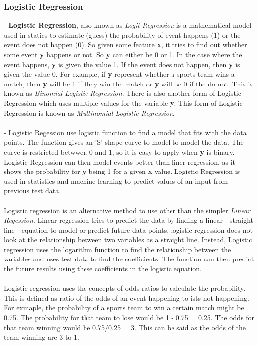 \subsubsection{Logistic Regression}
- \textbf{Logistic Regression}, also known as \textit{Logit Regression} is a mathematical model used in statics to estimate (guess) the probability of event happens (1) or the event does not happen (0). So given some feature \textbf{x}, it tries to find out whether some event \textbf{y} happens or not. So \textbf{y} can either be 0 or 1. In the case where the event happens, \textbf{y} is given the value 1. If the event does not happen, then \textbf{y} is given the value 0. For example, if \textbf{y} represent whether a sports team wins a match, then \textbf{y} will be 1 if they win the match or \textbf{y} will be 0 if the do not. This is known as \textit{Binomial Logistic Regression}. There is also another form of Logistic Regression which uses multiple values for the variable \textbf{y}. This form of Logistic Regression is known as \textit{Multinomial Logistic Regression}.\\
\\
- Logistic Regession use logistic function to find a model that fits with the data points. The function gives an 'S' shape curve to model to model the data. The curve is restricted betwwen 0 and 1, so it is easy to apply when \textbf{y} is binary. Logistic Regression can then model events better than liner regression, as it shows the probability for \textbf{y} being 1 for a given \textbf{x} value. Logistic Regression is used in statistics and machine learning to predict values of an input from previous test data.\\
\\
Logistic regression is an alternative method to use other than the simpler \textit{Linear Regession}. Linear regression tries to predict the data by finding a linear - straight line - equation to model or predict future data points. logistic regression does not look at the relationship between two variables as a straight line. Instead, Logistic regression uses the logarithm function to find the relationship between the variables and uses test data to find the coefficients. The function can then predict the future results using these coefficients in the logistic equation.\\
\\
Logistic regression uses the concepts of odds ratios to calculate the probability. This is defined as ratio  of the odds of an event happening to ists not happening. For exmaple, the probability of a sports team to win a certain match might be 0.75. The probability for that team to lose would be 1 - 0.75 = 0.25. The odds for that team winning would be 0.75/0.25 = 3. This can be said as the odds of the team winning are 3 to 1.\\
